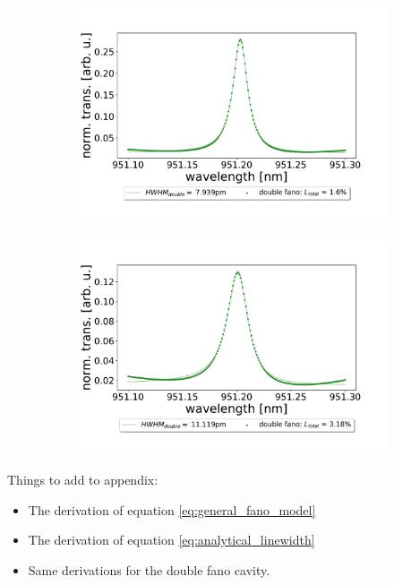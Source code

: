 \begin{figure}[h!]
\begin{subfigure}[b]{0.49\textwidth}
        \includegraphics[width=\textwidth]{figures/double_16_percent_loss_30um.pdf}
        \caption{}
        \label{fig:1.6_percent_loss}
    \end{subfigure}
    \begin{subfigure}[b]{0.49\textwidth}
        \includegraphics[width=\textwidth]{figures/double_32_percent_loss_30um.pdf}
        \caption{}
        \label{fig:3.2_percent_loss}
    \end{subfigure}
\end{figure}

\clearpage
Things to add to appendix:
\begin{itemize}
    \item The derivation of equation \ref{eq:general_fano_model}
    \item The derivation of equation \ref{eq:analytical_linewidth}
    \item Same derivations for the double fano cavity.
\end{itemize}